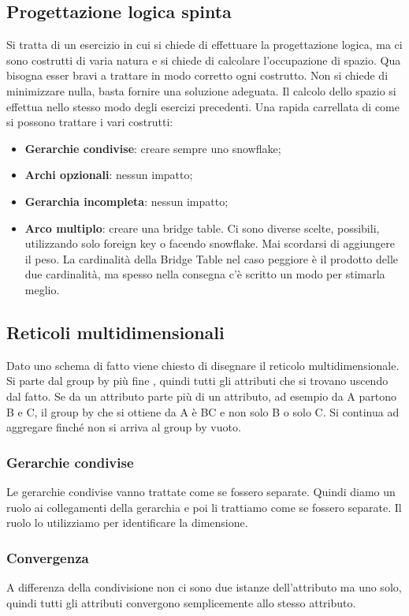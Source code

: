 \subsection{Progettazione logica spinta}
Si tratta di un esercizio in cui si chiede di effettuare la progettazione logica, ma ci sono costrutti di varia natura e si chiede di calcolare l'occupazione di spazio. Qua bisogna esser bravi a trattare in modo corretto ogni costrutto. Non si chiede di minimizzare nulla, basta fornire una soluzione adeguata. Il calcolo dello spazio si effettua nello stesso modo degli esercizi precedenti. Una rapida carrellata di come si possono trattare i vari costrutti:
\begin{itemize}
	\item \textbf{Gerarchie condivise}: creare sempre uno snowflake;
	\item \textbf{Archi opzionali}: nessun impatto;
	\item \textbf{Gerarchia incompleta}: nessun impatto;
	\item \textbf{Arco multiplo}: creare una bridge table. Ci sono diverse scelte, possibili, utilizzando solo foreign key o facendo snowflake. Mai scordarsi di aggiungere il peso. La cardinalità della Bridge Table nel caso peggiore è il prodotto delle due cardinalità, ma spesso nella consegna c'è scritto un modo per stimarla meglio.
\end{itemize}
\subsection{Reticoli multidimensionali}
Dato uno schema di fatto viene chiesto di disegnare il reticolo multidimensionale. Si parte dal group by più fine , quindi tutti gli attributi che si trovano uscendo dal fatto. Se da un attributo parte più di un attributo, ad esempio da A partono B e C, il group by che si ottiene da A è BC e non solo B o solo C. Si continua ad aggregare finché non si arriva al group by vuoto.
\subsubsection{Gerarchie condivise}
Le gerarchie condivise vanno trattate come se fossero separate. Quindi diamo un ruolo ai collegamenti della gerarchia e poi li trattiamo come se fossero separate. Il ruolo lo utilizziamo per identificare la dimensione.
\subsubsection{Convergenza}
A differenza della condivisione non ci sono due istanze dell'attributo ma uno solo, quindi tutti gli attributi convergono semplicemente allo stesso attributo.
